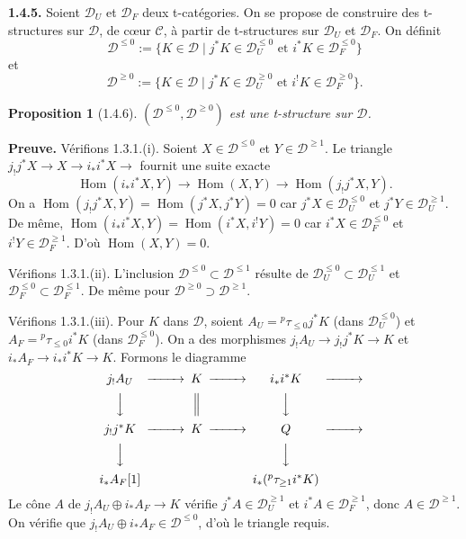 \documentclass[12pt,a4paper]{article}
\theoremstyle{plain}
\newtheorem{proposition}[theorem]{Proposition}
\theoremstyle{definition}
\theoremstyle{remark}
\DeclareMathOperator{\Hom}{Hom}
\newcommand{\cC}{\mathcal{C}}
\newcommand{\cD}{\mathcal{D}}
\begin{document}
\noindent
\textbf{1.4.5.} Soient $\cD_{U}$ et $\cD_{F}$ deux t-catégories. On se propose de construire des t-structures sur $\cD$, de cœur $\cC$, à partir de t-structures sur $\cD_{U}$ et $\cD_{F}$. On définit
\[
\cD^{\leq 0} := \{K \in \cD \mid j^{*}K \in \cD_{U}^{\leq 0} \text{ et } i^{*}K \in \cD_{F}^{\leq 0}\}
\]
et
\[
\cD^{\geq 0} := \{K \in \cD \mid j^{*}K \in \cD_{U}^{\geq 0} \text{ et } i^{!}K \in \cD_{F}^{\geq 0}\}.
\]

\begin{proposition}[1.4.6]
$(\cD^{\leq 0}, \cD^{\geq 0})$ est une t-structure sur $\cD$.
\end{proposition}

\smallskip

\noindent
\textbf{Preuve.} Vérifions 1.3.1.(i). Soient $X \in \cD^{\leq 0}$ et $Y \in \cD^{\geq 1}$. Le triangle $j_{!}j^{*}X \to X \to i_{*}i^{*}X \to$ fournit une suite exacte
\[
\Hom(i_{*}i^{*}X, Y) \to \Hom(X, Y) \to \Hom(j_{!}j^{*}X, Y).
\]
On a $\Hom(j_{!}j^{*}X, Y) = \Hom(j^{*}X, j^{*}Y) = 0$ car $j^{*}X \in \cD_{U}^{\leq 0}$ et $j^{*}Y \in \cD_{U}^{\geq 1}$. De même, $\Hom(i_{*}i^{*}X, Y) = \Hom(i^{*}X, i^{!}Y) = 0$ car $i^{*}X \in \cD_{F}^{\leq 0}$ et $i^{!}Y \in \cD_{F}^{\geq 1}$. D'où $\Hom(X, Y) = 0$.

Vérifions 1.3.1.(ii). L'inclusion $\cD^{\leq 0} \subset \cD^{\leq 1}$ résulte de $\cD_{U}^{\leq 0} \subset \cD_{U}^{\leq 1}$ et $\cD_{F}^{\leq 0} \subset \cD_{F}^{\leq 1}$. De même pour $\cD^{\geq 0} \supset \cD^{\geq 1}$.

Vérifions 1.3.1.(iii). Pour $K$ dans $\cD$, soient $A_{U} = {}^{p}\tau_{\leq 0}j^{*}K$ (dans $\cD_{U}^{\leq 0}$) et $A_{F} = {}^{p}\tau_{\leq 0}i^{*}K$ (dans $\cD_{F}^{\leq 0}$). On a des morphismes $j_{!}A_{U} \to j_{!}j^{*}K \to K$ et $i_{*}A_{F} \to i_{*}i^{*}K \to K$. Formons le diagramme
\[
\begin{CD}
j_{!}A_{U} @>>> K @>>> i_{*}i^{*}K @>>> \\
@VVV @| @VVV @. \\
j_{!}j^{*}K @>>> K @>>> Q @>>> \\
@VVV @. @VVV @. \\
i_{*}A_{F}[1] @. @. i_{*}({}^{p}\tau_{\geq 1}i^{*}K) @. 
\end{CD}
\]
Le cône $A$ de $j_{!}A_{U} \oplus i_{*}A_{F} \to K$ vérifie $j^{*}A \in \cD_{U}^{\geq 1}$ et $i^{*}A \in \cD_{F}^{\geq 1}$, donc $A \in \cD^{\geq 1}$. On vérifie que $j_{!}A_{U} \oplus i_{*}A_{F} \in \cD^{\leq 0}$, d'où le triangle requis.

\smallskip
\end{document}
